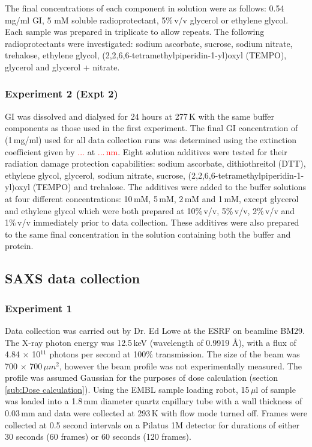The final concentrations of each component in solution were as follows:
0.54 mg/ml GI, 5 mM soluble radioprotectant, 5\%$\,$v/v glycerol or ethylene glycol.
Each sample was prepared in triplicate to allow repeats. The following radioprotectants were investigated: sodium ascorbate, sucrose, sodium nitrate, trehalose, ethylene glycol, (2,2,6,6-tetramethylpiperidin-1-yl)oxyl (TEMPO), glycerol and glycerol + nitrate.

\subsubsection{Experiment 2 (Expt 2)}
\label{subs:Experiment 2 - sample prep}
GI was dissolved and dialysed for 24 hours at 277$\,$K with the same buffer components as those used in the first experiment.
The final GI concentration of (1$\,$mg/ml) used for all data collection runs was determined using the extinction coefficient given by \textcolor{red}{...} at \textcolor{red}{$...\,$nm}.
Eight solution additives were tested for their radiation damage protection capabilities: sodium ascorbate, dithiothreitol (DTT), ethylene glycol, glycerol, sodium nitrate, sucrose, (2,2,6,6-tetramethylpiperidin-1-yl)oxyl (TEMPO) and trehalose.
The additives were added to the buffer solutions at four different concentrations: 10$\,$mM, 5$\,$mM, 2$\,$mM and 1$\,$mM, except glycerol and ethylene glycol which were both prepared at 10\%$\,$v/v, 5\%$\,$v/v, 2\%$\,$v/v and 1\%$\,$v/v immediately prior to data collection.
These additives were also prepared to the same final concentration in the solution containing both the buffer and protein.

\subsection{SAXS data collection}
\label{sub:SAXS data collection}

\subsubsection{Experiment 1}
\label{subs:Experiment 1- data col}
Data collection was carried out by Dr. Ed Lowe at the ESRF on beamline BM29.
The X-ray photon energy was 12.5$\,$keV (wavelength of 0.9919 \AA), with a flux of 4.84 $\times$ 10$^{\text{11}}$ photons per second at 100\% transmission.
The size of the beam was 700 $\times$ 700$\,\mu m^{\text{2}}$, however the beam profile was not experimentally measured.
The profile was assumed Gaussian for the purposes of dose calculation (section \ref{sub:Dose calculation}).
Using the EMBL sample loading robot, 15$\,\mu$l of sample was loaded into a 1.8$\,$mm diameter quartz capillary tube with a wall thickness of 0.03$\,$mm and data were collected at 293$\,$K with flow mode turned off.
Frames were collected at 0.5 second intervals on a Pilatus 1M detector for durations of either 30 seconds (60 frames) or 60 seconds (120  frames).


